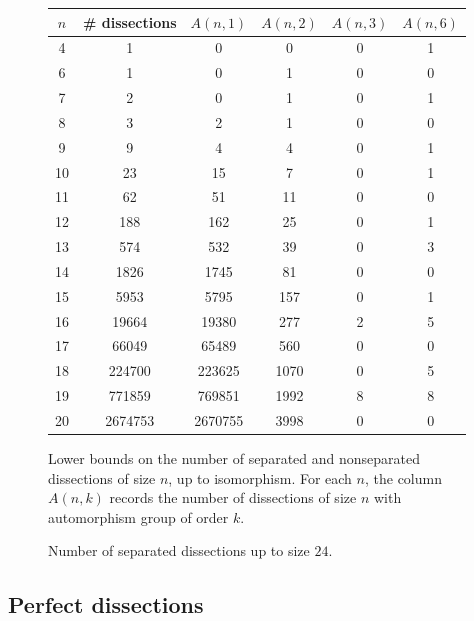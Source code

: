 \documentclass[12pt,amstags,fleqn]{article}
\theoremstyle{plain}
\theoremstyle{definition}
\begin{document}
\begin{figure}[htbp]
\begin{center}
\begin{tabular}{|c|c|c|c|c|c|}
\hline $n$ & \# dissections & $A(n,1)$ & $A(n,2)$ & $A(n,3)$ & $A(n,6)$ \\
\hline
\hline 4  & 1 & 0 & 0 & 0 & 1 \\
\hline 6  & 1 & 0 & 1 & 0 & 0 \\
\hline 7  & 2 & 0 & 1 & 0 & 1 \\
\hline 8  & 3 & 2 & 1 & 0 & 0 \\
\hline 9  & 9 & 4 & 4 & 0 & 1 \\
\hline 10 & 23 & 15 & 7 & 0 & 1 \\
\hline 11 & 62 & 51 & 11 & 0 & 0 \\
\hline 12 & 188 & 162 & 25 & 0 & 1 \\
\hline 13 & 574 & 532 & 39 & 0 & 3 \\
\hline 14 & 1826 & 1745 & 81 & 0 & 0 \\
\hline 15 & 5953 & 5795 & 157 & 0 & 1 \\
\hline 16 & 19664 & 19380 & 277 & 2 & 5 \\
\hline 17 & 66049 & 65489 & 560 & 0 & 0 \\
\hline 18 & 224700 & 223625 & 1070 & 0 & 5 \\
\hline 19 & 771859 & 769851 & 1992 & 8 & 8 \\
\hline 20 & 2674753 & 2670755 & 3998 & 0 & 0 \\
\hline
\end{tabular}
\end{center}
\caption{Lower bounds on the number of separated and nonseparated dissections of size $n$, up to isomorphism.
For each $n$, the column $A(n,k)$
records the number of dissections of size $n$ with
automorphism group of order $k$.}
\label{figCountSeparatedAndNonseparated}
\end{figure}
%

\begin{figure}[htbp]
\begin{center}
\end{center}
\caption{Number of separated dissections up to size $24$.}
\label{logSignatureCounts}
\end{figure}



\subsection{Perfect dissections}
\end{document}
